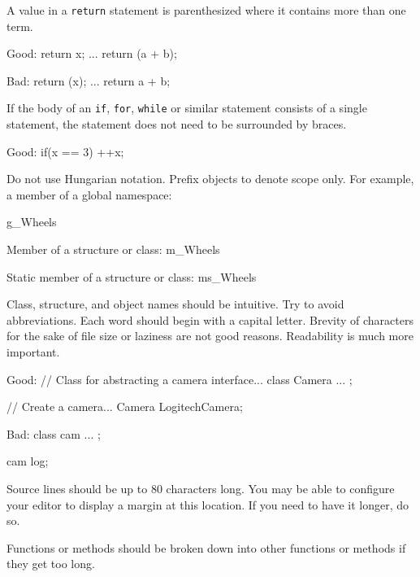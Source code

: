 \item
A value in a {\tt return} statement is parenthesized where it contains more than one term.

Good:
\startCodeExample
{
    return x;
}
...
{
    return (a + b);
}
\stopCodeExample

Bad:
\startCodeExample
{
    return (x);
}
...
{
    return a + b;
}
\stopCodeExample

\item
If the body of an {\tt if}, {\tt for}, {\tt while} or similar statement consists of a single statement, the statement does not need to be surrounded by braces.

Good:
\startCodeExample
if(x == 3)
  ++x;
\stopCodeExample

\stopitemize


\startitemize[4]
\item
Do not use Hungarian notation. Prefix objects to denote scope only. For example, a member of a global namespace:

\startCodeExample
g_Wheels
\stopCodeExample

Member of a structure or class:
\startCodeExample
m_Wheels
\stopCodeExample

Static member of a structure or class:
\startCodeExample
ms_Wheels
\stopCodeExample

\item
Class, structure, and object names should be intuitive. Try to avoid abbreviations. Each word should begin with a capital letter. Brevity of characters for the sake of file size or laziness are not good reasons. Readability is much more important.

Good:
\startCodeExample
// Class for abstracting a camera interface...
class Camera
{
    ...
};

// Create a camera...
Camera LogitechCamera;
\stopCodeExample

Bad:
\startCodeExample
class cam
{
    ...
};

cam log;
\stopCodeExample

\stopitemize


\startitemize[4]
\item
Source lines should be up to 80 characters long. You may be able to configure your editor to display a margin at this location. If you need to have it longer, do so.

\item
Functions or methods should be broken down into other functions or methods if they get too long.

